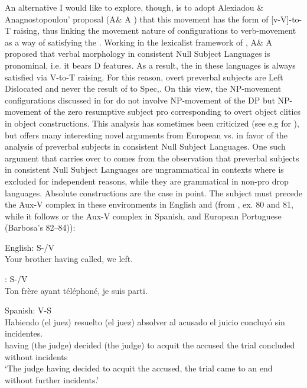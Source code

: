 \documentclass[output=paper]{LSP/langsci}
\begin{document}
An alternative I would like to explore, though, is to adopt Alexiadou \& Anagnostopoulou’ proposal (A\& A \citeyear{AlexiadouAnagnostopoulou1998}) that this movement has the form of [v-V]-to-T raising, thus linking the movement nature of  configurations to verb-movement as a way of satisfying the . Working in the lexicalist framework of \citet{Chomsky1995}, A\& A proposed that verbal  morphology in consistent Null Subject Languages is pronominal, i.e. it bears D features. As a result, the  in these languages is always satisfied via V-to-T raising. For this reason, overt preverbal subjects are  Left Dislocated and never the result of  to Spec,. On this view, the NP-movement configurations discussed in  for  do not involve NP-movement of the DP but NP-movement of the zero resumptive subject pro corresponding to overt object clitics in object  constructions. This analysis has sometimes been criticized (see e.g \citealt{SpyropoulosRevithiadou2009} for ), but \citet{Barbosa2009} offers many interesting novel arguments from European vs.  in favor of the  analysis of preverbal subjects in consistent Null Subject Languages. One such argument that carries over to  comes from the observation that preverbal subjects in consistent Null Subject Languages are ungrammatical in contexts where  is excluded for independent reasons, while they are grammatical in non-pro drop languages. Absolute constructions are the case in point. The subject must precede the Aux-V complex in these environments in English and  (from \citealt{Barbosa2009}, ex. 80 and 81, while it follows  or the Aux-V complex in Spanish,  and European Portuguese  (Barbosa’s 82--84)):

\ea%
\label{ex:anagnost:31}
English: S-/V\\
Your brother having called, we left.
\z

\ea%
\label{ex:anagnost:32}
: S-/V\\
Ton frère ayant téléphoné, je suis parti.  
\z

\ea%
\label{ex:anagnost:33}
Spanish: V-S\\
\gll Habiendo (el juez) resuelto (el juez) absolver al acusado el juicio concluyó sin incidentes.\\
having (the judge) decided (the judge) {to acquit} the accused the trial concluded without incidents\\
\glt ‘The judge having decided to acquit the accused, the trial came to an end without further incidents.’
\z
\end{document}
